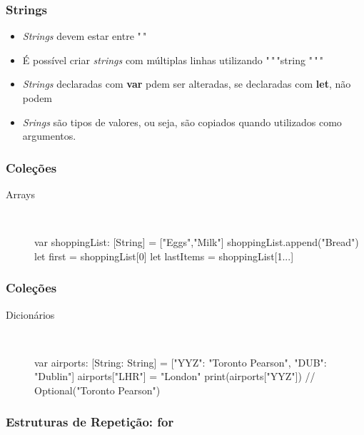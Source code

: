 \begin{frame}[fragile]
    \frametitle{Strings}

    \begin{itemize}
        \item \textit{Strings} devem estar entre "$\,\!$"
        \item É possível criar \textit{strings} com múltiplas linhas
        utilizando "$\,\!$"$\,\!$"string "$\,\!$"$\,\!$"
        \item \textit{Strings} declaradas com \textbf{var} pdem ser
        alteradas, se declaradas com \textbf{let}, não podem
        \item \textit{Srings} são tipos de valores, ou seja, são copiados
        quando utilizados como argumentos.
    \end{itemize}
\end{frame}

\begin{frame}[fragile]
    \frametitle{Coleções}

    \begin{description}
        \item[Arrays] \hfill \\
        \begin{swift}
var shoppingList: [String] = ["Eggs","Milk"]
shoppingList.append("Bread")
let first = shoppingList[0]
let lastItems = shoppingList[1...]
        \end{swift}
    \end{description}
\end{frame}

\begin{frame}[fragile]
    \frametitle{Coleções}

    \begin{description}
        \item[Dicionários] \hfill \\
        \begin{swift}
var airports: [String: String] =
    ["YYZ": "Toronto Pearson",
     "DUB": "Dublin"]
airports["LHR"] = "London"
print(airports["YYZ"])
    // Optional("Toronto Pearson")
        \end{swift}
    \end{description}
\end{frame}

\begin{frame}[fragile]
    \frametitle{Estruturas de Repetição: \textbf{for}}

\end{frame}

